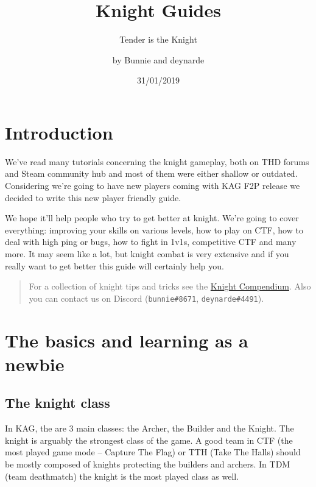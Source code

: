\documentclass[]{book}
\title{Knight Guides}
\subtitle{Tender is the Knight}
\author{by Bunnie and deynarde}
\date{31/01/2019}
\begin{document}
\maketitle

{
\setcounter{tocdepth}{1}
\tableofcontents
}
\hypertarget{introduction}{%
\chapter*{Introduction}\label{introduction}}

We've read many tutorials concerning the knight gameplay, both on THD forums and Steam community hub and most of them were either shallow or outdated. Considering we're going to have new players coming with KAG F2P release we decided to write this new player friendly guide.

We hope it'll help people who try to get better at knight. We're going to cover everything: improving your skills on various levels, how to play on CTF, how to deal with high ping or bugs, how to fight in 1v1s, competitive CTF and many more. It may seem like a lot, but knight combat is very extensive and if you really want to get better this guide will certainly help you.

\begin{quote}
For a collection of knight tips and tricks see the \href{https://deynarde.github.io/kag-knight-compendium/}{Knight Compendium}. Also you can contact us on Discord (\texttt{bunnie\#8671}, \texttt{deynarde\#4491}).
\end{quote}

\hypertarget{the-basics-and-learning-as-a-newbie}{%
\chapter{The basics and learning as a newbie}\label{the-basics-and-learning-as-a-newbie}}

\hypertarget{the-knight-class}{%
\section{The knight class}\label{the-knight-class}}

In KAG, the are 3 main classes: the Archer, the Builder and the Knight. The knight is arguably the strongest class of the game. A good team in CTF (the most played game mode -- Capture The Flag) or TTH (Take The Halls) should be mostly composed of knights protecting the builders and archers. In TDM (team deathmatch) the knight is the most played class as well.
\end{document}
